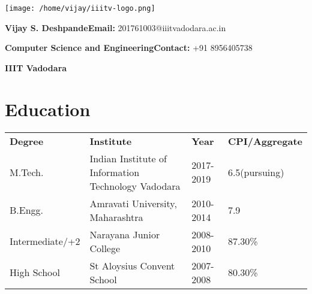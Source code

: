 \documentclass{article}
\begin{document}
\begin{minipage}{.1\textwidth}
	
\texttt{[image: /home/vijay/iiitv-logo.png]}
\end{minipage}%
\begin{minipage}{1.5\textwidth}
\begin{large}
	
	
\hspace*{2cm}\textbf{Vijay S. Deshpande}\hspace*{4cm}\textbf{Email:} 201761003@iiitvadodara.ac.in\vspace*{2mm}

\hspace*{2cm}\textbf{Computer Science and Engineering}\vspace*{2mm}\hspace*{0.8cm}\textbf{Contact:} +91 8956405738

\hspace*{2cm}\textbf{IIIT Vadodara}\vspace*{2mm}


%
%
\end{large}    
\end{minipage}

\section{Education}
\begin{tabular}{llll}
\textbf{Degree}&\textbf{Institute}&\textbf{Year}&\textbf{CPI/Aggregate}\vspace*{1mm} \\
M.Tech.& Indian Institute of Information Technology Vadodara & 2017-2019 & 6.5(pursuing) \\
B.Engg.& Amravati University, Maharashtra & 2010-2014 & 7.9\\
Intermediate/+2 & Narayana Junior College & 2008-2010 & 87.30\%\\
High School & St Aloysius Convent School & 2007-2008 & 80.30\%\\
\end{tabular}
\end{document}
